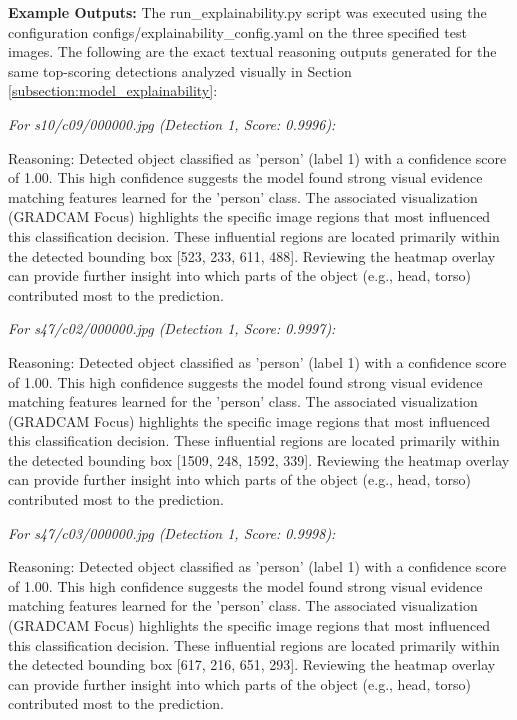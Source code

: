 \textbf{Example Outputs:}
The {run\_explainability.py} script was executed using the configuration {configs/explainability\_config.yaml} on the three specified test images. The following are the exact textual reasoning outputs generated for the same top-scoring detections analyzed visually in Section \ref{subsection:model_explainability}:

\textit{For s10/c09/000000.jpg (Detection 1, Score: 0.9996):}

Reasoning: Detected object classified as 'person' (label 1) with a 
confidence score of 1.00. This high confidence suggests the model 
found strong visual evidence matching features learned for the 
'person' class. The associated visualization (GRADCAM Focus) 
highlights the specific image regions that most influenced this 
classification decision. These influential regions are located 
primarily within the detected bounding box [523, 233, 611, 488]. 
Reviewing the heatmap overlay can provide further insight into which 
parts of the object (e.g., head, torso) contributed most to the 
prediction.


\textit{For s47/c02/000000.jpg (Detection 1, Score: 0.9997):}

Reasoning: Detected object classified as 'person' (label 1) with a 
confidence score of 1.00. This high confidence suggests the model 
found strong visual evidence matching features learned for the 
'person' class. The associated visualization (GRADCAM Focus) 
highlights the specific image regions that most influenced this 
classification decision. These influential regions are located 
primarily within the detected bounding box [1509, 248, 1592, 339]. 
Reviewing the heatmap overlay can provide further insight into which 
parts of the object (e.g., head, torso) contributed most to the 
prediction.

\textit{For s47/c03/000000.jpg (Detection 1, Score: 0.9998):}

Reasoning: Detected object classified as 'person' (label 1) with a 
confidence score of 1.00. This high confidence suggests the model 
found strong visual evidence matching features learned for the 
'person' class. The associated visualization (GRADCAM Focus) 
highlights the specific image regions that most influenced this 
classification decision. These influential regions are located 
primarily within the detected bounding box [617, 216, 651, 293]. 
Reviewing the heatmap overlay can provide further insight into which 
parts of the object (e.g., head, torso) contributed most to the 
prediction.

